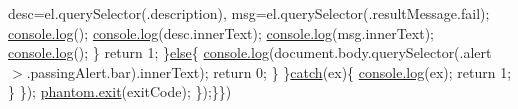 \begin{DoxyCompactItemize}
                                                                                    desc=el.\+query\+Selector(\textquotesingle{}.description\textquotesingle{}),                                                                                                               msg=el.\+query\+Selector(\textquotesingle{}.result\+Message.\+fail\textquotesingle{});                                                                                               \hyperlink{version_8js_a8805635a2f9bf454129d95456a5d317a}{console.\+log}(\textquotesingle{}\textquotesingle{});                                                                                               \hyperlink{version_8js_a8805635a2f9bf454129d95456a5d317a}{console.\+log}(desc.\+inner\+Text);                                                                                               \hyperlink{version_8js_a8805635a2f9bf454129d95456a5d317a}{console.\+log}(msg.\+inner\+Text);                                                                                               \hyperlink{version_8js_a8805635a2f9bf454129d95456a5d317a}{console.\+log}(\textquotesingle{}\textquotesingle{});                                                                               \}                                                                               return 1;                                                                       \}\hyperlink{sleepsort_8js_a0544c3fe466e421738dae463968b70ba}{else}\{                                                                               \hyperlink{version_8js_a8805635a2f9bf454129d95456a5d317a}{console.\+log}(document.\+body.\+query\+Selector(\textquotesingle{}.alert $>$.passing\+Alert.\+bar\textquotesingle{}).inner\+Text);                                                                               return 0;                                                                       \}                                                       \}\hyperlink{echo_to_file_8js_a5bf45fc51bc0426586792b5f9cb95431}{catch}(ex)\{                                                                       \hyperlink{version_8js_a8805635a2f9bf454129d95456a5d317a}{console.\+log}(ex);                                                                       return 1;                                                       \}                                       \});                                       \hyperlink{version_8js_a01fca00da67a8c60470b440fa7083bf7}{phantom.\+exit}(exit\+Code);                       \});\}\})
\end{DoxyCompactItemize}
